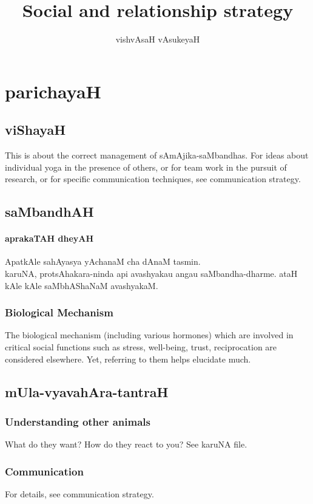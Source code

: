\documentclass[oneside, article]{memoir}
\title{Social and relationship strategy}
\author{vishvAsaH vAsukeyaH}
\begin{document}
\maketitle
\part{parichayaH}
\chapter{viShayaH}
This is about the correct management of sAmAjika-saMbandhas. For ideas about individual yoga in the presence of others, or for team work in the pursuit of research, or for specific communication techniques, see communication strategy.

\chapter{saMbandhAH}
\subsection{aprakaTAH dheyAH}
ApatkAle sahAyasya yAchanaM cha dAnaM tasmin.  \\
karuNA, protsAhakara-ninda api avashyakau angau saMbandha-dharme. ataH kAle kAle saMbhAShaNaM avashyakaM. 

\section{Biological Mechanism}
The biological mechanism (including various hormones) which are involved in critical social functions such as stress, well-being, trust, reciprocation are considered elsewhere. Yet, referring to them helps elucidate much.

\chapter{mUla-vyavahAra-tantraH}
\section{Understanding other animals}
What do they want? How do they react to you? See karuNA file.

\section{Communication}
For details, see communication strategy.
\end{document}
